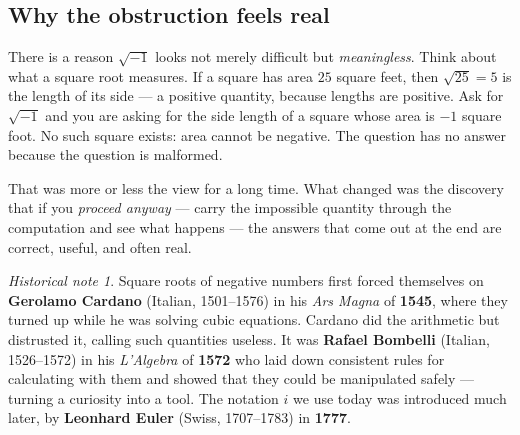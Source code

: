 \documentclass[11pt]{article}
\theoremstyle{definition}
\theoremstyle{remark}
\newtheorem*{hist}{Historical note}
\begin{document}
\begin{center}
\hspace{1.1cm}
\end{center}

\subsection*{Why the obstruction feels real}
There is a reason $\sqrt{-1}$ looks not merely difficult but \emph{meaningless}.
Think about what a square root measures. If a square has area $25$ square feet,
then $\sqrt{25}=5$ is the length of its side --- a positive quantity, because
lengths are positive. Ask for $\sqrt{-1}$ and you are asking for the side length
of a square whose area is $-1$ square foot. No such square exists: area cannot be
negative. The question has no answer because the question is malformed.

That was more or less the view for a long time. What changed was the discovery
that if you \emph{proceed anyway} --- carry the impossible quantity through the
computation and see what happens --- the answers that come out at the end are
correct, useful, and often real.

\begin{hist}
Square roots of negative numbers first forced themselves on
\textbf{Gerolamo Cardano} (Italian, 1501--1576) in his \emph{Ars Magna} of
\textbf{1545}, where they turned up while he was solving cubic equations.
Cardano did the arithmetic but distrusted it, calling such quantities useless.
It was \textbf{Rafael Bombelli} (Italian, 1526--1572) in his \emph{L'Algebra} of
\textbf{1572} who laid down consistent rules for calculating with them and
showed that they could be manipulated safely --- turning a curiosity into a
tool. The notation $i$ we use today was introduced much later, by
\textbf{Leonhard Euler} (Swiss, 1707--1783) in \textbf{1777}.
\end{hist}
\end{document}
